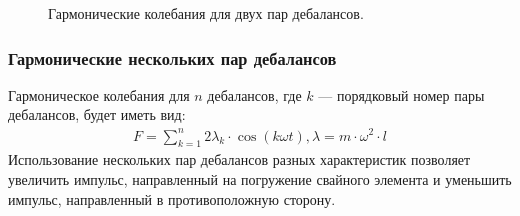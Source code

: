 \documentclass[10pt, pdf, hyperref={unicode}]{beamer}
\begin{document}
\begin{frame}
\begin{center}
\begin{minipage}[h]{0.97\linewidth}
\begin{minipage}[h]{0.44\linewidth}
\begin{figure}[h]
                        \caption{Гармонические колебания для двух пар дебалансов.}
                    \end{figure}
                \end{minipage}
            \end{minipage}
        \end{center}
    \end{frame}

    \begin{frame}
        \frametitle{Гармонические нескольких пар дебалансов}
        \begin{center}
            \begin{minipage}[h]{0.97\linewidth}
                Гармоническое колебания для $n$ дебалансов, где $k$ --- порядковый номер пары дебалансов, будет иметь вид:
                \begin{equation}\label{eq:harmonic_sum}
                    \begin{gathered}
                        F = \sum\limits_{k = 1}^n 2 \lambda_k \cdot \cos (k \omega t), \lambda = m \cdot \omega^2 \cdot l
                    \end{gathered}
                \end{equation}
                Использование нескольких пар дебалансов разных характеристик позволяет увеличить импульс,
                направленный на погружение свайного элемента и уменьшить импульс, направленный в противоположную сторону.
            \end{minipage}
        \end{center}
    \end{frame}
\end{document}
